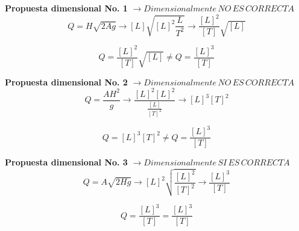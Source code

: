 \documentclass[11pt,letterpaper]{article}
\begin{document}
\textbf{Propuesta dimensional No. 1} $\rightarrow Dimensionalmente\, NO\, ES\, CORRECTA$\\

\begin{equation*}
Q=H\sqrt{2Ag} \rightarrow [L]\sqrt{[L]^2\frac{L}{T^2}} \rightarrow  \frac{[L]^2}{[T]}\sqrt{[L]} 
\end{equation*}

\begin{equation*}
Q=\frac{[L]^2}{[T]}\sqrt{[L]}  \neq Q=\frac{[L]^3}{[T]}
\end{equation*}

\textbf{Propuesta dimensional No. 2} $\rightarrow Dimensionalmente\, NO\, ES\, CORRECTA$\\

\begin{equation*}
Q=\frac{AH^2}{g} \rightarrow \frac{[L]^2[L]^2}{\frac{[L]}{[T]^2}}  \rightarrow [L]^3[T]^2
\end{equation*}

\begin{equation*}
Q=[L]^3[T]^2 \neq Q=\frac{[L]^3}{[T]}
\end{equation*}

\textbf{Propuesta dimensional No. 3}  $\rightarrow Dimensionalmente\, SI\, ES\, CORRECTA$\\

\begin{equation*}
Q=A\sqrt{2Hg} \rightarrow [L]^2\sqrt{\frac{[L]^2}{[T]^2}} \rightarrow \frac{[L]^3}{[T]}
\end{equation*}

\begin{equation*}
Q=\frac{[L]^3}{[T]} = \frac{[L]^3}{[T]}
\end{equation*}


\end{document}
